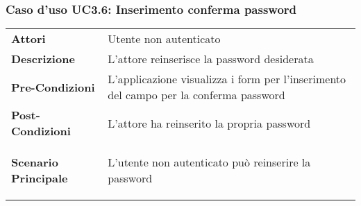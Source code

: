 \subsubsection{Caso d'uso UC3.6:  Inserimento conferma password}
\label{UC3_6}

\begin{longtable}{ l | p{11cm}}
	\hline
	\rowcolor{Gray}
	 \multicolumn{2}{c}{UC3.6 - Inserimento conferma password} \\
	 \hline
	\textbf{Attori} & Utente non autenticato \\
	\textbf{Descrizione} & L'attore reinserisce la password desiderata  \\
	\textbf{Pre-Condizioni} & L'applicazione visualizza i form per l'inserimento del campo per la conferma password \\
	\textbf{Post-Condizioni} & L'attore ha reinserito la propria password \\
	\textbf{Scenario Principale} & \begin{enumerate*}[label=(\arabic*.),itemjoin={\newline}]
		\item L'utente non autenticato può reinserire la password
	\end{enumerate*}\\
\end{longtable}